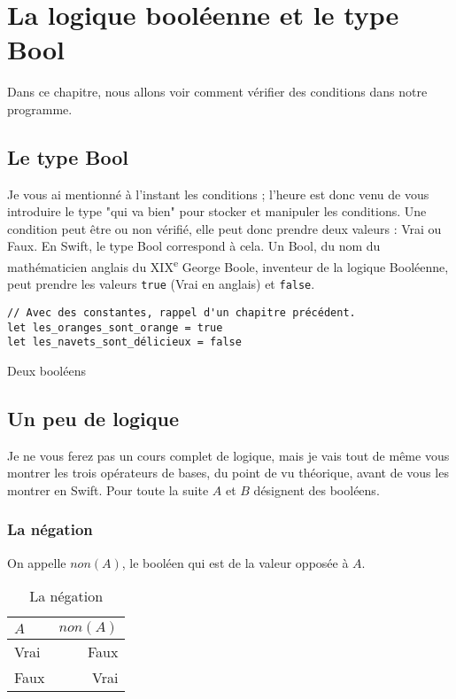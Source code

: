 \chapter{La logique booléenne et le type Bool}
Dans ce chapitre, nous allons voir comment vérifier des conditions dans notre programme.

\section{Le type Bool}
Je vous ai mentionné à l'instant les conditions ;
l'heure est donc venu de vous introduire le type
"qui va bien" pour stocker et manipuler les conditions.
Une condition peut être ou non vérifié, elle peut donc prendre deux valeurs : Vrai ou Faux.
En Swift, le type Bool correspond à cela. Un Bool, du nom du mathématicien anglais du XIX\textsuperscript{e} George Boole,
inventeur de la logique Booléenne, peut prendre les valeurs \texttt{true} (Vrai en anglais) et \texttt{false}.
\begin{listing}
\begin{verbatim}
// Avec des constantes, rappel d'un chapitre précédent.
let les_oranges_sont_orange = true
let les_navets_sont_délicieux = false
\end{verbatim}
\caption{Deux booléens}
\end{listing}
\section{Un peu de logique}
Je ne vous ferez pas un cours complet de logique, mais je vais tout de même vous montrer les trois opérateurs de bases,
du point de vu théorique, avant de vous les montrer en Swift.
Pour toute la suite $A$ et $B$ désignent des booléens.
\subsection{La négation}
On appelle $non(A)$, le booléen qui est de la valeur opposée à $A$.
\begin{table}[h]
\centering
\begin{tabu} spread \linewidth {|l|r|}
\hline
$A$ & $non(A)$ \\ \hline
Vrai & Faux \\ \hline
Faux & Vrai \\ \hline
\end{tabu}
\caption{La négation}
\end{table}
